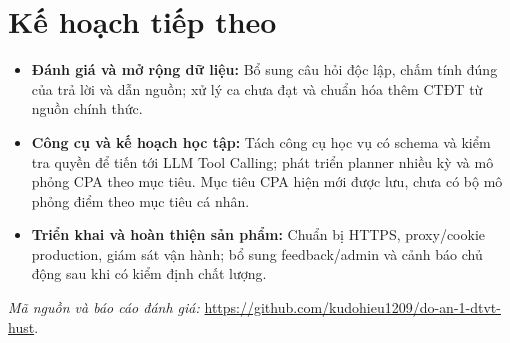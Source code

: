 \documentclass[11pt,a4paper]{article}
\begin{document}
\section{Kế hoạch tiếp theo}
\begin{itemize}
  \item \textbf{Đánh giá và mở rộng dữ liệu:} Bổ sung câu hỏi độc lập, chấm tính đúng của trả lời và dẫn nguồn; xử lý ca chưa đạt và chuẩn hóa thêm CTĐT từ nguồn chính thức.
  \item \textbf{Công cụ và kế hoạch học tập:} Tách công cụ học vụ có schema và kiểm tra quyền để tiến tới LLM Tool Calling; phát triển planner nhiều kỳ và mô phỏng CPA theo mục tiêu. Mục tiêu CPA hiện mới được lưu, chưa có bộ mô phỏng điểm theo mục tiêu cá nhân.
  \item \textbf{Triển khai và hoàn thiện sản phẩm:} Chuẩn bị HTTPS, proxy/cookie production, giám sát vận hành; bổ sung feedback/admin và cảnh báo chủ động sau khi có kiểm định chất lượng.
\end{itemize}
\noindent\textit{Mã nguồn và báo cáo đánh giá:} \url{https://github.com/kudohieu1209/do-an-1-dtvt-hust}.
\end{document}
